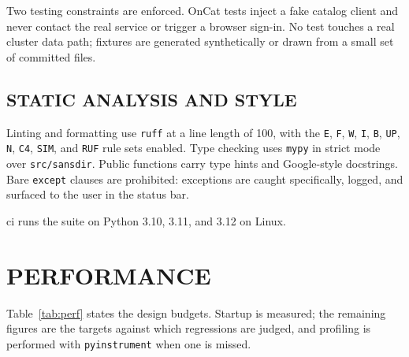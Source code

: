 \documentclass[tm]{ornltm}
\begin{document}
Two testing constraints are enforced. OnCat tests inject a fake catalog client
and never contact the real service or trigger a browser sign-in. No test touches
a real cluster data path; fixtures are generated synthetically or drawn from a
small set of committed files.

\subsection{STATIC ANALYSIS AND STYLE}

Linting and formatting use \texttt{ruff} at a line length of 100, with the
\texttt{E}, \texttt{F}, \texttt{W}, \texttt{I}, \texttt{B}, \texttt{UP},
\texttt{N}, \texttt{C4}, \texttt{SIM}, and \texttt{RUF} rule sets enabled.
Type checking uses \texttt{mypy} in strict mode over \texttt{src/sansdir}.
Public functions carry type hints and Google-style docstrings. Bare
\texttt{except} clauses are prohibited: exceptions are caught specifically,
logged, and surfaced to the user in the status bar.

\Ac{ci} runs the suite on Python 3.10, 3.11, and 3.12 on Linux.

\section{PERFORMANCE}
\label{sec:perf}

Table~\ref{tab:perf} states the design budgets. Startup is measured; the
remaining figures are the targets against which regressions are judged, and
profiling is performed with \texttt{pyinstrument} when one is missed.
\end{document}
